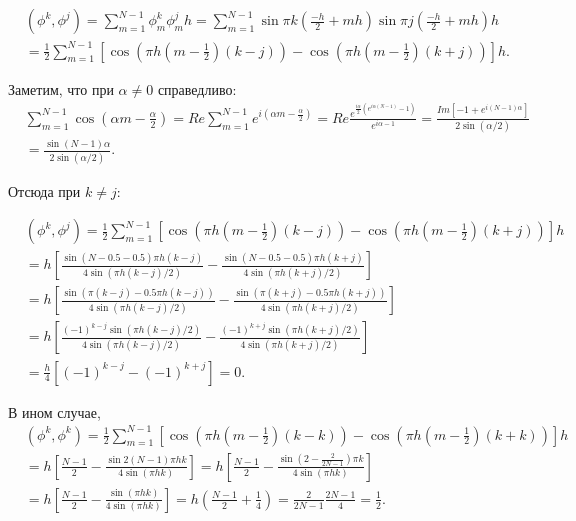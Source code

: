 \documentclass[14pt,a4paper]{extarticle}
\newcommand{\1}{\mathbbm{1}}
\begin{document}
\begin{align*}
    & (\phi^k, \phi^j) = \sum_{m = 1}^{N - 1} \phi_m^k \phi_m^j h 
    = \sum_{m = 1}^{N - 1} \sin{\pi k (\frac{-h}{2} + m h)} \sin{\pi j (\frac{-h}{2} + m h)} h \\ 
    & = \frac{1}{2} \sum_{m = 1}^{N - 1} [ \cos{(\pi h (m - \frac{1}{2})(k - j))} - \cos{(\pi h (m - \frac{1}{2})(k + j))} ] h.
\end{align*}

Заметим, что при $\alpha \neq 0$ справедливо:
\begin{align*}
    & \sum_{m = 1}^{N - 1} \cos(\alpha m - \frac{\alpha}{2}) = Re\sum_{m = 1}^{N - 1} e^{i (\alpha m - \frac{\alpha}{2})} 
     = Re \frac{e^{\frac{i \alpha}{2}(e^{i \alpha (N - 1)} - 1)}}{e^{i \alpha - 1}} 
     = \frac{Im [-1 + e^{i (N - 1) \alpha}]}{2 \sin(\alpha/2)} \\
    & = \frac{\sin{(N - 1) \alpha}}{2 \sin(\alpha/2)}.
\end{align*}

Отсюда при $k \neq j$:

\begin{align*}
    & (\phi^k, \phi^j) 
    = \frac{1}{2} \sum_{m = 1}^{N - 1} [ \cos{(\pi h (m - \frac{1}{2})(k - j))} - \cos{(\pi h (m - \frac{1}{2})(k + j))} ] h \\
    & = h \left[ \frac{\sin{(N - 0.5 - 0.5) \pi h (k - j)}}{4 \sin(\pi h (k - j)/2)} - \frac{\sin{(N - 0.5 - 0.5) \pi h (k + j)}}{4 \sin(\pi h (k + j)/2)} \right] \\
    & = h \left[ \frac{\sin(\pi (k - j) - 0.5 \pi h (k - j))}{4 \sin(\pi h (k - j)/2)}
        - \frac{\sin(\pi (k + j) - 0.5 \pi h (k + j))}{4 \sin(\pi h (k + j)/2)}\right] \\
    & = h \left[ \frac{(-1)^{k-j}\sin(\pi h (k - j)/2)}{4 \sin(\pi h (k - j)/2)}
    - \frac{(-1)^{k+j}\sin(\pi h (k + j)/2)}{4 \sin(\pi h (k + j)/2)}\right] \\
    & = \frac{h}{4} [(-1)^{k-j} - (-1)^{k+j}] = 0.
\end{align*}

В ином случае, 
\begin{align*}
    & (\phi^k, \phi^k) 
    = \frac{1}{2} \sum_{m = 1}^{N - 1} [ \cos{(\pi h (m - \frac{1}{2})(k - k))} - \cos{(\pi h (m - \frac{1}{2})(k + k))} ] h \\
    & = h \left[ \frac{N - 1}{2} - \frac{\sin{2 (N - 1) \pi h k}}{4 \sin(\pi h k)} \right] 
    =h \left[ \frac{N - 1}{2} - \frac{\sin{(2 - \frac{2}{2 N - 1} )\pi k}}{4 \sin(\pi h k)} \right] \\
    & =h \left[ \frac{N - 1}{2} - \frac{\sin(\pi h k)}{4 \sin(\pi h k)} \right] 
    = h\left(\frac{N-1}{2}+\frac{1}{4}\right)  = \frac{2}{2 N - 1} \frac{2 N - 1}{4} = \frac{1}{2}.
\end{align*}
\end{document}
